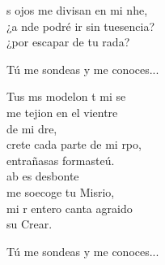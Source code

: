\begin{cancion}
	s ojos me divisan en mi nhe, \\
	¿a nde podré ir sin tuesencia? \\
	¿por escapar de tu rada? \jump\\
	\begin{chorus}%
	Tú me sondeas y me conoces... \jump\\
	\end{chorus}%
	Tus ms modelon t mi se \\
	me tejion en el vientre\\
	de mi dre, \\
	crete cada parte de mi rpo, \\
	 entrañasas formasteú. \\
	\jump
	ab es desbonte \\
	me soecoge tu Misrio, \\
	mi r entero canta agraido \\
	 su Crear. \jump\\
	\begin{chorus}%
	Tú me sondeas y me conoces... \jump\\
	\end{chorus}%
\end{cancion}%
